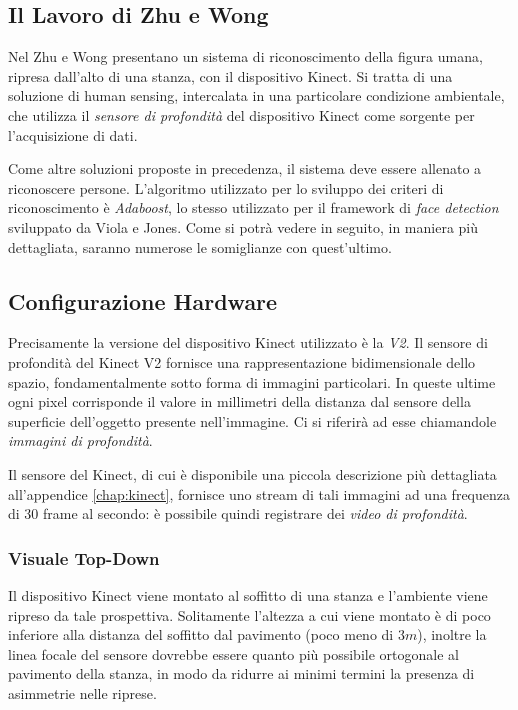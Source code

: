         \subsection{Il Lavoro di Zhu e Wong} %
        \label{sub:il_lavoro_di_zhu_e_wong}
            Nel \citeyear{Zhu13} Zhu e Wong presentano un sistema di riconoscimento della figura umana, ripresa dall'alto di una stanza, con il dispositivo Kinect.
            Si tratta di una soluzione di human sensing, intercalata in una particolare condizione ambientale, che utilizza il \emph{sensore di profondità} del dispositivo Kinect come sorgente per l'acquisizione di dati.

            Come altre soluzioni proposte in precedenza, il sistema deve essere allenato a riconoscere persone.
            L'algoritmo utilizzato per lo sviluppo dei criteri di riconoscimento è \emph{Adaboost}, lo stesso utilizzato per il framework di \emph{face detection} sviluppato da Viola e Jones.
            Come si potrà vedere in seguito, in maniera più dettagliata, saranno numerose le somiglianze con quest'ultimo.

        \subsection{Configurazione Hardware}
        \label{sub:hardware_configuration}
            Precisamente la versione del dispositivo Kinect utilizzato è la \emph{V2}.
            Il sensore di profondità del Kinect V2 fornisce una rappresentazione bidimensionale dello spazio, fondamentalmente sotto forma di immagini particolari. 
            In queste ultime ogni pixel corrisponde il valore in millimetri della distanza dal sensore della superficie dell'oggetto presente nell'immagine.
            Ci si riferirà ad esse chiamandole \emph{immagini di profondità}.

            Il sensore del Kinect, di cui è disponibile una piccola descrizione più dettagliata all'appendice \ref{chap:kinect}, fornisce uno stream di tali immagini ad una frequenza di 30 frame al secondo: è possibile quindi registrare dei \emph{video di profondità}.

            \subsubsection{Visuale Top-Down}
                Il dispositivo Kinect viene montato al soffitto di una stanza e l'ambiente viene ripreso da tale prospettiva.
                Solitamente l'altezza a cui viene montato è di poco inferiore alla distanza del soffitto dal pavimento (poco meno di $3m$), inoltre la linea focale del sensore dovrebbe essere quanto più possibile ortogonale al pavimento della stanza, in modo da ridurre ai minimi termini la presenza di asimmetrie nelle riprese.
                
